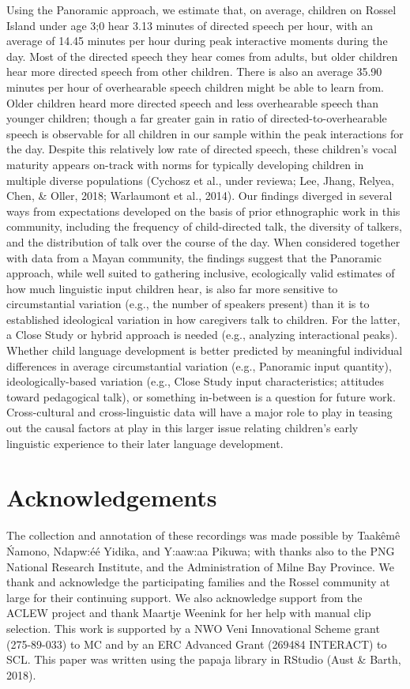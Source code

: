 \documentclass[,man,floatsintext]{apa6}
\begin{document}
Using the Panoramic approach, we estimate that, on average, children on
Rossel Island under age 3;0 hear 3.13 minutes of directed speech per
hour, with an average of 14.45 minutes per hour during peak interactive
moments during the day. Most of the directed speech they hear comes from
adults, but older children hear more directed speech from other
children. There is also an average 35.90 minutes per hour of
overhearable speech children might be able to learn from. Older children
heard more directed speech and less overhearable speech than younger
children; though a far greater gain in ratio of directed-to-overhearable
speech is observable for all children in our sample within the peak
interactions for the day. Despite this relatively low rate of directed
speech, these children's vocal maturity appears on-track with norms for
typically developing children in multiple diverse populations (Cychosz
et al., under reviewa; Lee, Jhang, Relyea, Chen, \& Oller, 2018;
Warlaumont et al., 2014). Our findings diverged in several ways from
expectations developed on the basis of prior ethnographic work in this
community, including the frequency of child-directed talk, the diversity
of talkers, and the distribution of talk over the course of the day.
When considered together with data from a Mayan community, the findings
suggest that the Panoramic approach, while well suited to gathering
inclusive, ecologically valid estimates of how much linguistic input
children hear, is also far more sensitive to circumstantial variation
(e.g., the number of speakers present) than it is to established
ideological variation in how caregivers talk to children. For the
latter, a Close Study or hybrid approach is needed (e.g., analyzing
interactional peaks). Whether child language development is better
predicted by meaningful individual differences in average circumstantial
variation (e.g., Panoramic input quantity), ideologically-based
variation (e.g., Close Study input characteristics; attitudes toward
pedagogical talk), or something in-between is a question for future
work. Cross-cultural and cross-linguistic data will have a major role to
play in teasing out the causal factors at play in this larger issue
relating children's early linguistic experience to their later language
development.

\section{Acknowledgements}\label{acknowledgements}

The collection and annotation of these recordings was made possible by
Taakêmê Ńamono, Ndapw:éé Yidika, and Y:aaw:aa Pikuwa; with thanks also
to the PNG National Research Institute, and the Administration of Milne
Bay Province. We thank and acknowledge the participating families and
the Rossel community at large for their continuing support. We also
acknowledge support from the ACLEW project and thank Maartje Weenink for
her help with manual clip selection. This work is supported by a NWO
Veni Innovational Scheme grant (275-89-033) to MC and by an ERC Advanced
Grant (269484 INTERACT) to SCL. This paper was written using the papaja
library in RStudio (Aust \& Barth, 2018).
\end{document}

